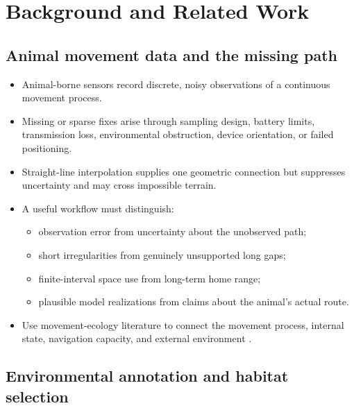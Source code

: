 \chapter{Background and Related Work}
\label{chap:background}

\section{Animal movement data and the missing path}

\begin{itemize}
  \item Animal-borne sensors record discrete, noisy observations of a continuous movement process.
  \item Missing or sparse fixes arise through sampling design, battery limits, transmission loss, environmental obstruction, device orientation, or failed positioning.
  \item Straight-line interpolation supplies one geometric connection but suppresses uncertainty and may cross impossible terrain.
  \item A useful workflow must distinguish:
  \begin{itemize}
    \item observation error from uncertainty about the unobserved path;
    \item short irregularities from genuinely unsupported long gaps;
    \item finite-interval space use from long-term home range;
    \item plausible model realizations from claims about the animal's actual route.
  \end{itemize}
  \item Use movement-ecology literature to connect the movement process, internal state, navigation capacity, and external environment \parencite{nathan2008movement}.
\end{itemize}

\section{Environmental annotation and habitat selection}
\label{sec:environmental-annotation-and-habitat-selection}

